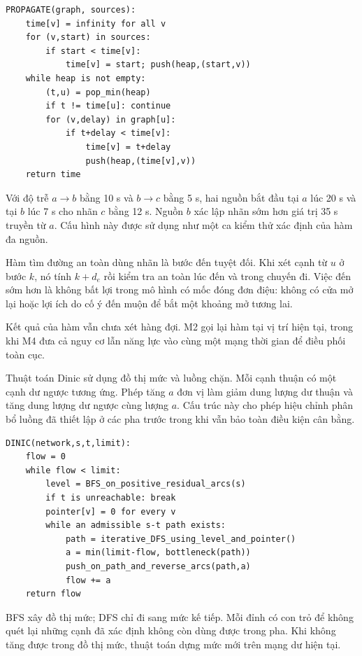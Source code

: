 \begin{algorithm}[htbp]\caption{Lan truyền thời điểm sự kiện}\label{alg:2}
\begin{lstlisting}[frame=none]
PROPAGATE(graph, sources):
    time[v] = infinity for all v
    for (v,start) in sources:
        if start < time[v]:
            time[v] = start; push(heap,(start,v))
    while heap is not empty:
        (t,u) = pop_min(heap)
        if t != time[u]: continue
        for (v,delay) in graph[u]:
            if t+delay < time[v]:
                time[v] = t+delay
                push(heap,(time[v],v))
    return time
\end{lstlisting}
\end{algorithm}
Với độ trễ $a\to b$ bằng 10 s và $b\to c$ bằng 5 s, hai nguồn bắt đầu tại $a$ lúc 20 s và tại $b$ lúc 7 s cho nhãn $c$ bằng 12 s. Nguồn $b$ xác lập nhãn sớm hơn giá trị 35 s truyền từ $a$. Cấu hình này được sử dụng như một ca kiểm thử xác định của hàm đa nguồn.

Hàm tìm đường an toàn dùng nhãn là bước đến tuyệt đối. Khi xét cạnh từ $u$ ở bước $k$, nó tính $k+d_e$ rồi kiểm tra an toàn lúc đến và trong chuyến đi. Việc đến sớm hơn là không bất lợi trong mô hình có mốc đóng đơn điệu: không có cửa mở lại hoặc lợi ích do cố ý đến muộn để bắt một khoảng mở tương lai.

Kết quả của hàm vẫn chưa xét hàng đợi. M2 gọi lại hàm tại vị trí hiện tại, trong khi M4 đưa cả nguy cơ lẫn năng lực vào cùng một mạng thời gian để điều phối toàn cục.

Thuật toán Dinic \cite{dinic} sử dụng đồ thị mức và luồng chặn. Mỗi cạnh thuận có một cạnh dư ngược tương ứng. Phép tăng $a$ đơn vị làm giảm dung lượng dư thuận và tăng dung lượng dư ngược cùng lượng $a$. Cấu trúc này cho phép hiệu chỉnh phân bổ luồng đã thiết lập ở các pha trước trong khi vẫn bảo toàn điều kiện cân bằng.

\begin{algorithm}[htbp]\caption{Giải luồng cực đại bằng Dinic}\label{alg:3}
\begin{lstlisting}[frame=none]
DINIC(network,s,t,limit):
    flow = 0
    while flow < limit:
        level = BFS_on_positive_residual_arcs(s)
        if t is unreachable: break
        pointer[v] = 0 for every v
        while an admissible s-t path exists:
            path = iterative_DFS_using_level_and_pointer()
            a = min(limit-flow, bottleneck(path))
            push_on_path_and_reverse_arcs(path,a)
            flow += a
    return flow
\end{lstlisting}
\end{algorithm}
BFS xây đồ thị mức; DFS chỉ đi sang mức kế tiếp. Mỗi đỉnh có con trỏ để không quét lại những cạnh đã xác định không còn dùng được trong pha. Khi không tăng được trong đồ thị mức, thuật toán dựng mức mới trên mạng dư hiện tại.

